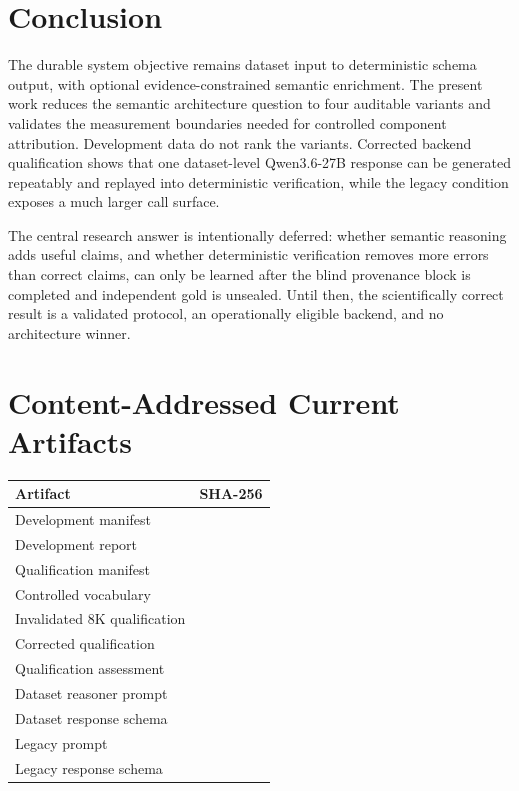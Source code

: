 \documentclass[11pt]{article}
\newcommand{\artifacthash}[1]{{\scriptsize\ttfamily\expandafter\seqsplit\expandafter{#1}}}
\begin{document}
\section{Conclusion}

The durable system objective remains dataset input to deterministic schema output,
with optional evidence-constrained semantic enrichment. The present work reduces
the semantic architecture question to four auditable variants and validates the
measurement boundaries needed for controlled component attribution. Development
data do not rank the variants. Corrected backend qualification shows that one dataset-level
Qwen3.6-27B response can be generated repeatably and replayed into deterministic
verification, while the legacy condition exposes a much larger call surface.

The central research answer is intentionally deferred: whether semantic reasoning
adds useful claims, and whether deterministic verification removes more errors than
correct claims, can only be learned after the blind provenance block is completed
and independent gold is unsealed. Until then, the scientifically correct result is
a validated protocol, an operationally eligible backend, and no architecture winner.

\appendix
\section{Content-Addressed Current Artifacts}
\label{app:artifacts}

\begin{longtable}{@{}>{\raggedright\arraybackslash}p{5.2cm}>{\raggedright\arraybackslash}p{10.0cm}@{}}
\toprule
Artifact & SHA-256 \\
\midrule
\endhead
Development manifest & \artifacthash{\DevManifestHash} \\
Development report & \artifacthash{\DevReportHash} \\
Qualification manifest & \artifacthash{\QualManifestHash} \\
Controlled vocabulary & \artifacthash{\VocabularyHash} \\
Invalidated 8K qualification & \artifacthash{\InvalidQualHash} \\
Corrected qualification & \artifacthash{\ValidQualHash} \\
Qualification assessment & \artifacthash{\QualAssessmentHash} \\
Dataset reasoner prompt & \artifacthash{\DatasetPromptHash} \\
Dataset response schema & \artifacthash{\DatasetSchemaHash} \\
Legacy prompt & \artifacthash{\LegacyPromptHash} \\
Legacy response schema & \artifacthash{\LegacySchemaHash} \\
\bottomrule
\end{longtable}
\end{document}
